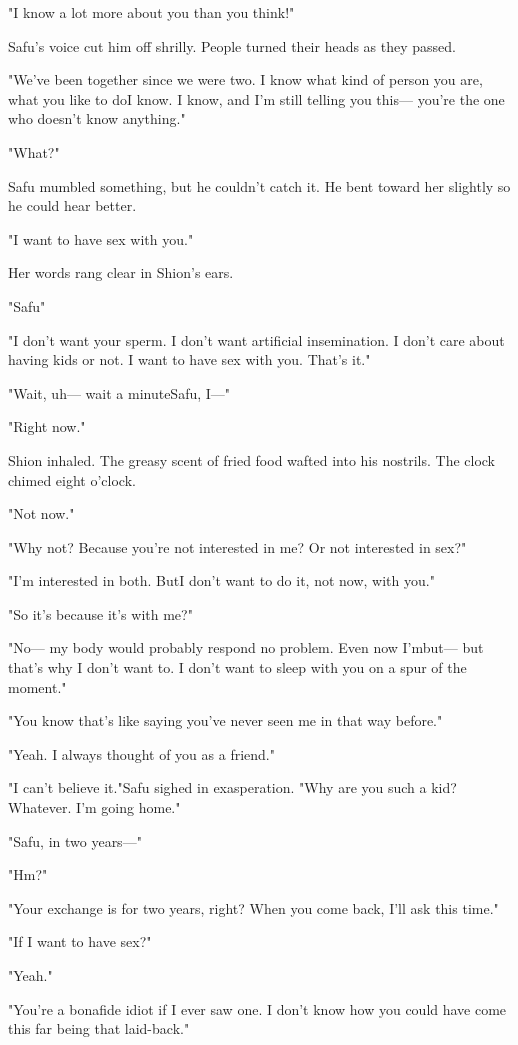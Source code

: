 "I know a lot more about you than you think!"

Safu's voice cut him off shrilly. People turned their heads as they
passed.

"We've been together since we were two. I know what kind of person you
are, what you like to do\el I know. I know, and I'm still telling you
this--- you're the one who doesn't know anything."

"What?"

Safu mumbled something, but he couldn't catch it. He bent toward her
slightly so he could hear better.

"I want to have sex with you."

Her words rang clear in Shion's ears.

"Safu\el "

"I don't want your sperm. I don't want artificial insemination. I don't
care about having kids or not. I want to have sex with you. That's it."

"Wait, uh--- wait a minute\el Safu, I---"

"Right now."

Shion inhaled. The greasy scent of fried food wafted into his nostrils.
The clock chimed eight o'clock.

"Not now."

"Why not? Because you're not interested in me? Or not interested in
sex?"

"I'm interested in both. But\el I don't want to do it, not now, with
you."

"So it's because it's with me?"

"No--- my body would probably respond no problem. Even now I'm\el but--- but
that's why I don't want to. I don't want to sleep with you on a spur of
the moment."

"You know that's like saying you've never seen me in that way before."

"Yeah. I always thought of you as a friend."

"I can't believe it."Safu sighed in exasperation. "Why are you such a
kid? Whatever. I'm going home."

"Safu, in two years---"

"Hm?"

"Your exchange is for two years, right? When you come back, I'll ask
this time."

"If I want to have sex?"

"Yeah."

"You're a bonafide idiot if I ever saw one. I don't know how you could
have come this far being that laid-back."

